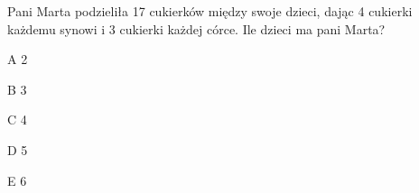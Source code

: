 \begin{tresc}
Pani Marta podzieliła 17 cukierków między swoje dzieci, dając 4 cukierki każdemu synowi i 3 cukierki każdej córce. Ile dzieci ma pani Marta?
\end{tresc}
\begin{wariant}{A} 2 \end{wariant}
\begin{wariant}{B} 3 \end{wariant}
\begin{wariant}{C} 4 \end{wariant}
\begin{wariant}{D} 5 \end{wariant}
\begin{wariant}{E} 6 \end{wariant}
